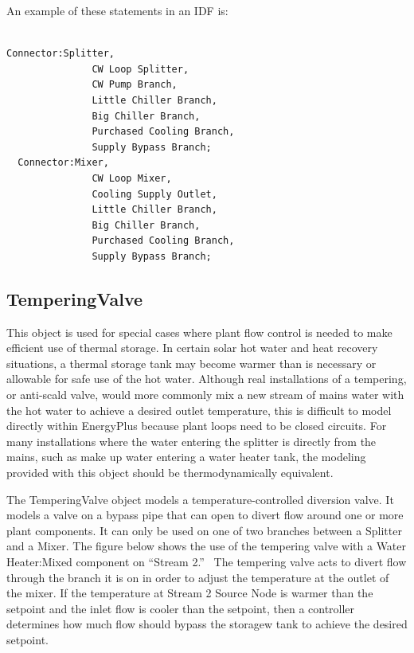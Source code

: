An example of these statements in an IDF is:

\begin{lstlisting}

Connector:Splitter,
               CW Loop Splitter,
               CW Pump Branch,
               Little Chiller Branch,
               Big Chiller Branch,
               Purchased Cooling Branch,
               Supply Bypass Branch;
  Connector:Mixer,
               CW Loop Mixer,
               Cooling Supply Outlet,
               Little Chiller Branch,
               Big Chiller Branch,
               Purchased Cooling Branch,
               Supply Bypass Branch;
\end{lstlisting}

\subsection{TemperingValve}\label{temperingvalve}

This object is used for special cases where plant flow control is needed to make efficient use of thermal storage. In certain solar hot water and heat recovery situations, a thermal storage tank may become warmer than is necessary or allowable for safe use of the hot water. Although real installations of a tempering, or anti-scald valve, would more commonly mix a new stream of mains water with the hot water to achieve a desired outlet temperature, this is difficult to model directly within EnergyPlus because plant loops need to be closed circuits. For many installations where the water entering the splitter is directly from the mains, such as make up water entering a water heater tank, the modeling provided with this object should be thermodynamically equivalent.

The TemperingValve object models a temperature-controlled diversion valve. It models a valve on a bypass pipe that can open to divert flow around one or more plant components. It can only be used on one of two branches between a Splitter and a Mixer. The figure below shows the use of the tempering valve with a Water Heater:Mixed component on ``Stream 2.''~ The tempering valve acts to divert flow through the branch it is on in order to adjust the temperature at the outlet of the mixer. If the temperature at Stream 2 Source Node is warmer than the setpoint and the inlet flow is cooler than the setpoint, then a controller determines how much flow should bypass the storagew tank to achieve the desired setpoint.

